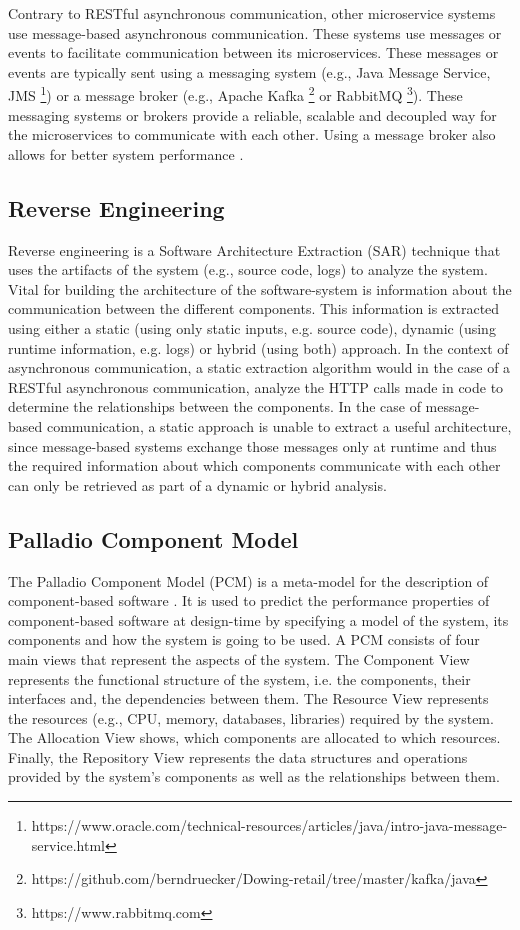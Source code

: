 Contrary to RESTful asynchronous communication, other microservice systems use message-based asynchronous communication.
These systems use messages or events to facilitate communication between its microservices.
These messages or events are typically sent using a messaging system (e.g., Java Message Service, JMS \footnote{https://www.oracle.com/technical-resources/articles/java/intro-java-message-service.html}) or a message broker (e.g., Apache Kafka \footnote{https://github.com/berndruecker/Dowing-retail/tree/master/kafka/java} or RabbitMQ \footnote{https://www.rabbitmq.com}).
These messaging systems or brokers provide a reliable, scalable and decoupled way for the microservices to communicate with each other.
Using a message broker also allows for better system performance \cite{Singh2021}.


\subsection{Reverse Engineering}
\label{sec:Foundation:SAR}
Reverse engineering is a Software Architecture Extraction (SAR) technique that uses the artifacts of the system (e.g., source code, logs) to analyze the system.
Vital for building the architecture of the software-system is information about the communication between the different components.
This information is extracted using either a static (using only static inputs, e.g. source code), dynamic (using runtime information, e.g. logs) or hybrid (using both) approach.
In the context of asynchronous communication, a static extraction algorithm would in the case of a RESTful asynchronous communication, analyze the HTTP calls made in code to determine the relationships between the components.
In the case of message-based communication, a static approach is unable to extract a useful architecture, since message-based systems exchange those messages only at runtime and thus the required information about which components communicate with each other can only be retrieved as part of a dynamic or hybrid analysis. \cite{Singh2021,Mayer2018}


\subsection{Palladio Component Model}
\label{sec:Foundation:PCM}
The Palladio Component Model (PCM) is a meta-model for the description of component-based software \cite{Becker2008}.
It is used to predict the performance properties of component-based software at design-time by specifying a model of the system, its components and how the system is going to be used.
A PCM consists of four main views that represent the aspects of the system.
The Component View represents the functional structure of the system, i.e. the components, their interfaces and, the dependencies between them.
The Resource View represents the resources (e.g., CPU, memory, databases, libraries) required by the system.
The Allocation View shows, which components are allocated to which resources.
Finally, the Repository View represents the data structures and operations provided by the system's components as well as the relationships between them. \cite{Becker2008}
